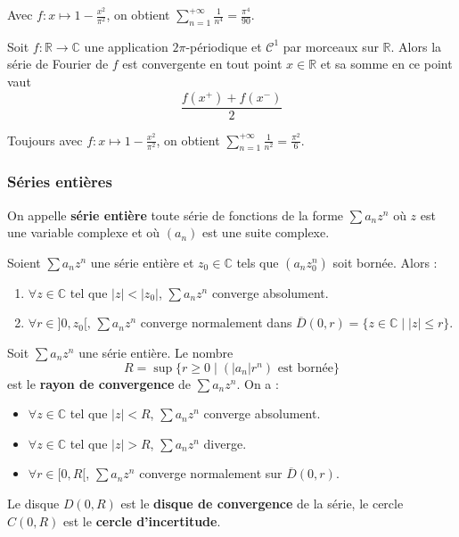 	\begin{example}
		Avec $f : x \mapsto 1 - \frac{x^2}{\pi^2}$, on obtient $\sum_{n=1}^{+\infty} \frac{1}{n^4} = \frac{\pi^4}{90}$.
	\end{example}

	\begin{theorem}
		Soit $f : \mathbb{R} \rightarrow \mathbb{C}$ une application $2\pi$-périodique et $\mathcal{C}^1$ par morceaux sur $\mathbb{R}$. Alors la série de Fourier de $f$ est convergente en tout point $x \in \mathbb{R}$ et sa somme en ce point vaut
		\[ \frac{f(x^+) + f(x^-)}{2} \]
	\end{theorem}

	\begin{example}
		Toujours avec $f : x \mapsto 1 - \frac{x^2}{\pi^2}$, on obtient $\sum_{n=1}^{+\infty} \frac{1}{n^2} = \frac{\pi^2}{6}$.
	\end{example}

	\subsubsection{Séries entières}


	\begin{definition}
		On appelle \textbf{série entière} toute série de fonctions de la forme $\sum a_n z^n$ où $z$ est une variable complexe et où $(a_n)$ est une suite complexe.
	\end{definition}

	\begin{lemma}[Abel]
		Soient $\sum a_n z^n$ une série entière et $z_0 \in \mathbb{C}$ tels que $(a_n z_0^n)$ soit bornée. Alors :
		\begin{enumerate}[label=(\roman*)]
			\item $\forall z \in \mathbb{C}$ tel que $|z| < |z_0|$, $\sum a_n z^n$ converge absolument.
			\item $\forall r \in ]0,z_0[, \, \sum a_n z^n$ converge normalement dans $\overline{D}(0, r) = \{ z \in \mathbb{C} \mid |z| \leq r \}$.
		\end{enumerate}
	\end{lemma}

	\begin{definition}
		Soit $\sum a_n z^n$ une série entière. Le nombre
		\[ R = \sup \{ r \geq 0 \mid (|a_n|r^n) \text{ est bornée} \} \]
		est le \textbf{rayon de convergence} de $\sum a_n z^n$. On a :
		\begin{itemize}
			\item $\forall z \in \mathbb{C}$ tel que $|z| < R$, $\sum a_n z^n$ converge absolument.
			\item $\forall z \in \mathbb{C}$ tel que $|z| > R$, $\sum a_n z^n$ diverge.
			\item $\forall r \in [0,R[$, $\sum a_n z^n$ converge normalement sur $\overline{D}(0,r)$.
		\end{itemize}
		Le disque $D(0,R)$ est le \textbf{disque de convergence} de la série, le cercle $C(0,R)$ est le \textbf{cercle d'incertitude}.
	\end{definition}

